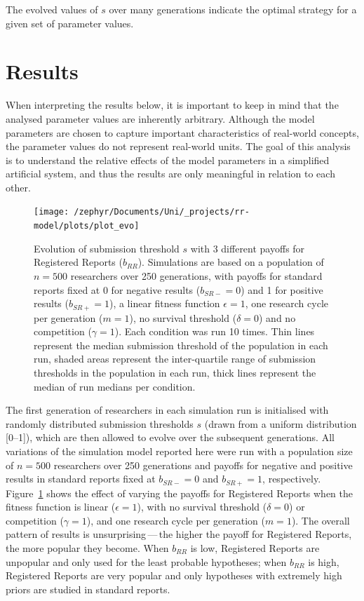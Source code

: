 \documentclass[british,,man,floatsintext]{apa6}
\begin{document}
The evolved values of \(s\) over many generations indicate the optimal strategy for a given set of parameter values.

\hypertarget{results}{%
\section{Results}\label{results}}

When interpreting the results below, it is important to keep in mind that the analysed parameter values are inherently arbitrary.
Although the model parameters are chosen to capture important characteristics of real-world concepts, the parameter values do not represent real-world units.
The goal of this analysis is to understand the relative effects of the model parameters in a simplified artificial system, and thus the results are only meaningful in relation to each other.



\begin{figure}

{\centering \texttt{[image: /zephyr/Documents/Uni/\_projects/rr-model/plots/plot\_evo]} 

}

\caption{Evolution of submission threshold \(s\) with 3 different payoffs for Registered Reports (\(b_{RR}\)). Simulations are based on a population of \(n = 500\) researchers over 250 generations, with payoffs for standard reports fixed at 0 for negative results (\(b_{SR-} = 0\)) and 1 for positive results (\(b_{SR+} = 1\)), a linear fitness function \(\epsilon = 1\), one research cycle per generation (\(m = 1\)), no survival threshold (\(\delta = 0\)) and no competition (\(\gamma = 1\)). Each condition was run 10 times. Thin lines represent the median submission threshold of the population in each run, shaded areas represent the inter-quartile range of submission thresholds in the population in each run, thick lines represent the median of run medians per condition.}\label{fig:evoplot}
\end{figure}

The first generation of researchers in each simulation run is initialised with randomly distributed submission thresholds \(s\) (drawn from a uniform distribution {[}0--1{]}), which are then allowed to evolve over the subsequent generations.
All variations of the simulation model reported here were run with a population size of \(n = 500\) researchers over 250 generations and payoffs for negative and positive results in standard reports fixed at \(b_{SR-} = 0\) and \(b_{SR+} = 1\), respectively.
Figure~\ref{fig:evoplot} shows the effect of varying the payoffs for Registered Reports when the fitness function is linear (\(\epsilon = 1\)), with no survival threshold (\(\delta = 0\)) or competition (\(\gamma = 1\)), and one research cycle per generation (\(m = 1\)).
The overall pattern of results is unsurprising\(\,\)---\(\,\)the higher the payoff for Registered Reports, the more popular they become.
When \(b_{RR}\) is low, Registered Reports are unpopular and only used for the least probable hypotheses; when \(b_{RR}\) is high, Registered Reports are very popular and only hypotheses with extremely high priors are studied in standard reports.
\end{document}
